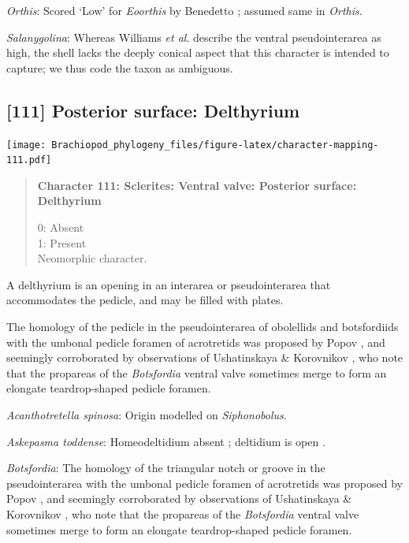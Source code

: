 \documentclass[openany]{book}
\begin{document}
\hypertarget{Orthis-coding-110}{}
\emph{Orthis}: Scored `Low' for \emph{Eoorthis} by Benedetto
\citeyearpar{Benedetto2009iChaniella}; assumed same in \emph{Orthis}.

\hypertarget{Salanygolina-coding-110}{}
\emph{Salanygolina}: Whereas Williams \emph{et al}.
\citeyearpar[p.~156]{Williams2000LinguliformeaCraniiformea} describe the
ventral pseudointerarea as high, the shell lacks the deeply conical
aspect that this character is intended to capture; we thus code the
taxon as ambiguous.

\subsection*{{[}111{]} Posterior surface:
Delthyrium}\label{posterior-surface-delthyrium}

\texttt{[image: Brachiopod\_phylogeny\_files/figure-latex/character-mapping-111.pdf]}

\begin{quote}
\textbf{Character 111: Sclerites: Ventral valve: Posterior surface:
Delthyrium}

0: Absent\\
1: Present\\
Neomorphic character.
\end{quote}

A delthyrium is an opening in an interarea or pseudointerarea that
accommodates the pedicle, and may be filled with plates.

The homology of the pedicle in the pseudointerarea of obolellids and
botsfordiids with the umbonal pedicle foramen of acrotretids was
proposed by Popov \citeyearpar{Popov1992TheCambrian}, and seemingly
corroborated by observations of Ushatinskaya \& Korovnikov
\citeyearpar{Ushatinskaya2016Revisionof}, who note that the propareas of
the \emph{Botsfordia} ventral valve sometimes merge to form an elongate
teardrop-shaped pedicle foramen.

\hypertarget{Acanthotretella_spinosa-coding-111}{}
\emph{Acanthotretella spinosa}: Origin modelled on \emph{Siphonobolus}.

\hypertarget{Askepasma_toddense-coding-111}{}
\emph{Askepasma toddense}: Homeodeltidium absent
\citep[p.~153]{Williams2000LinguliformeaCraniiformea}; deltidium is open
\citep[see][fig. 4]{Topper2013Theoldest}.

\hypertarget{Botsfordia-coding-111}{}
\emph{Botsfordia}: The homology of the triangular notch or groove in the
pseudointerarea with the umbonal pedicle foramen of acrotretids was
proposed by Popov \citeyearpar{Popov1992TheCambrian}, and seemingly
corroborated by observations of Ushatinskaya \& Korovnikov
\citeyearpar{Ushatinskaya2016Revisionof}, who note that the propareas of
the \emph{Botsfordia} ventral valve sometimes merge to form an elongate
teardrop-shaped pedicle foramen.
\end{document}

